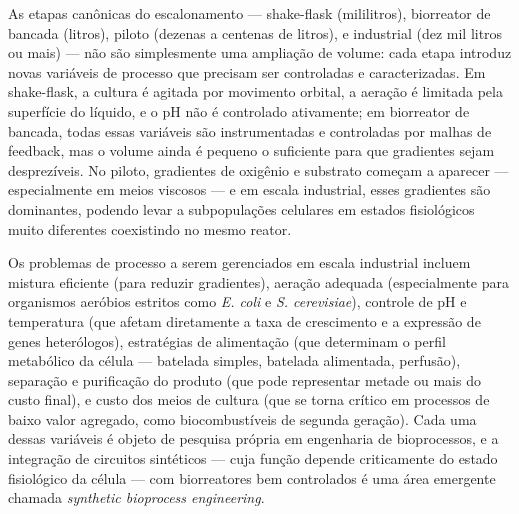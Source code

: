 As etapas canônicas do escalonamento --- shake-flask (mililitros), biorreator de bancada (litros), piloto (dezenas a centenas de litros), e industrial (dez mil litros ou mais) --- não são simplesmente uma ampliação de volume: cada etapa introduz novas variáveis de processo que precisam ser controladas e caracterizadas. Em shake-flask, a cultura é agitada por movimento orbital, a aeração é limitada pela superfície do líquido, e o pH não é controlado ativamente; em biorreator de bancada, todas essas variáveis são instrumentadas e controladas por malhas de feedback, mas o volume ainda é pequeno o suficiente para que gradientes sejam desprezíveis. No piloto, gradientes de oxigênio e substrato começam a aparecer --- especialmente em meios viscosos --- e em escala industrial, esses gradientes são dominantes, podendo levar a subpopulações celulares em estados fisiológicos muito diferentes coexistindo no mesmo reator.

Os problemas de processo a serem gerenciados em escala industrial incluem mistura eficiente (para reduzir gradientes), aeração adequada (especialmente para organismos aeróbios estritos como \textit{E. coli} e \textit{S. cerevisiae}), controle de pH e temperatura (que afetam diretamente a taxa de crescimento e a expressão de genes heterólogos), estratégias de alimentação (que determinam o perfil metabólico da célula --- batelada simples, batelada alimentada, perfusão), separação e purificação do produto (que pode representar metade ou mais do custo final), e custo dos meios de cultura (que se torna crítico em processos de baixo valor agregado, como biocombustíveis de segunda geração). Cada uma dessas variáveis é objeto de pesquisa própria em engenharia de bioprocessos, e a integração de circuitos sintéticos --- cuja função depende criticamente do estado fisiológico da célula --- com biorreatores bem controlados é uma área emergente chamada \emph{synthetic bioprocess engineering}.


